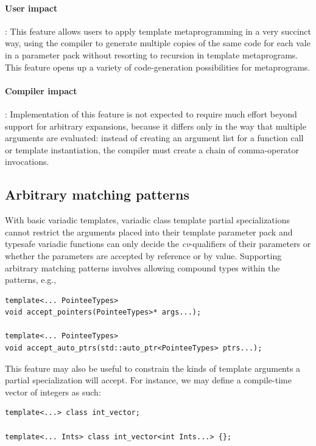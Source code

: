 \documentclass{article}
\begin{document}
\paragraph{User impact}: This feature allows users to apply template
metaprogramming in a very succinct way, using the compiler to generate
multiple copies of the same code for each vale in a parameter pack
without resorting to recursion in template metaprograms. This feature
opens up a variety of code-generation possibilities for metaprograms.

\paragraph{Compiler impact}: Implementation of this feature is not
expected to require much effort beyond support for arbitrary
expansions, because it differs only in the way that multiple arguments
are evaluated: instead of creating an argument list for a function
call or template instantiation, the compiler must create a chain of
comma-operator invocations.

\subsection{Arbitrary matching patterns}
With basic variadic templates, variadic class template partial specializations
cannot restrict the arguments placed into their template parameter
pack and typesafe variadic functions can only decide the
\textit{cv}-qualifiers of their parameters or whether the parameters are
accepted by reference or by value. Supporting arbitrary matching
patterns involves allowing compound types within the patterns, e.g.,

\begin{verbatim}
template<... PointeeTypes>
void accept_pointers(PointeeTypes>* args...);

template<... PointeeTypes>
void accept_auto_ptrs(std::auto_ptr<PointeeTypes> ptrs...);
\end{verbatim}

This feature may also be useful to constrain the kinds of template
arguments a partial specialization will accept. For instance, we may
define a compile-time vector of integers as such:

\begin{verbatim}
template<...> class int_vector;

template<... Ints> class int_vector<int Ints...> {};
\end{verbatim}
\end{document}
